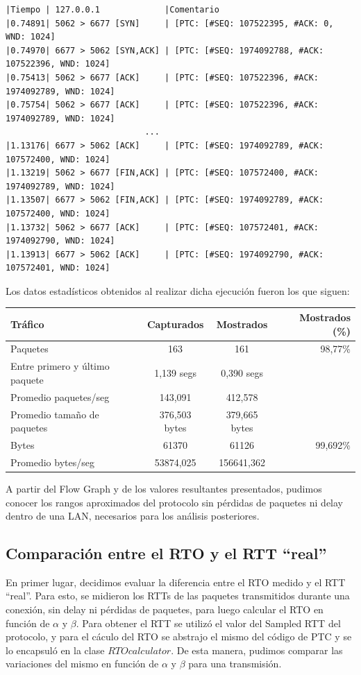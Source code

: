 \documentclass[10pt, a4paper]{article}
\begin{document}
\begin{verbatim}
|Tiempo | 127.0.0.1             |Comentario
|0.74891| 5062 > 6677 [SYN]     | [PTC: [#SEQ: 107522395, #ACK: 0, WND: 1024]
|0.74970| 6677 > 5062 [SYN,ACK] | [PTC: [#SEQ: 1974092788, #ACK: 107522396, WND: 1024]
|0.75413| 5062 > 6677 [ACK]     | [PTC: [#SEQ: 107522396, #ACK: 1974092789, WND: 1024]
|0.75754| 5062 > 6677 [ACK]     | [PTC: [#SEQ: 107522396, #ACK: 1974092789, WND: 1024]	
							...
|1.13176| 6677 > 5062 [ACK]     | [PTC: [#SEQ: 1974092789, #ACK: 107572400, WND: 1024]
|1.13219| 5062 > 6677 [FIN,ACK]	| [PTC: [#SEQ: 107572400, #ACK: 1974092789, WND: 1024]
|1.13507| 6677 > 5062 [FIN,ACK]	| [PTC: [#SEQ: 1974092789, #ACK: 107572400, WND: 1024]					
|1.13732| 5062 > 6677 [ACK]     | [PTC: [#SEQ: 107572401, #ACK: 1974092790, WND: 1024]
|1.13913| 6677 > 5062 [ACK]     | [PTC: [#SEQ: 1974092790, #ACK: 107572401, WND: 1024]
\end{verbatim}

Los datos estadísticos obtenidos al realizar dicha ejecución fueron los que siguen:\\

\begin{tabular}{l | c | c  | r}
\textbf{Tráfico} & \textbf{Capturados} & \textbf{Mostrados} & \textbf{Mostrados (\%)}\\
\hline
Paquetes & 163 & 161 & 98,77\%\\
\hline
Entre primero y último paquete & 1,139 segs & 0,390 segs & \\
\hline
Promedio paquetes/seg & 143,091 & 412,578 & \\
\hline
Promedio tamaño de paquetes & 376,503 bytes & 379,665 bytes & \\
\hline
Bytes & 61370 & 61126 & 99,692\% \\
\hline
Promedio bytes/seg & 53874,025 & 156641,362 & \\
\hline
\end{tabular}


A partir del Flow Graph y de los valores resultantes presentados, pudimos conocer los rangos aproximados del protocolo sin pérdidas de paquetes ni delay dentro de una LAN, necesarios para los análisis posteriores.
\newpage
\subsection{Comparación entre el RTO y el RTT ``real''}

En primer lugar, decidimos evaluar la diferencia entre el RTO medido y el RTT ``real''. 
Para esto, se midieron los RTTs de las paquetes transmitidos durante una conexión, sin delay ni pérdidas de paquetes, para luego calcular el RTO en función de $\alpha$ y $\beta$.
Para obtener el RTT se utilizó el valor del Sampled RTT del protocolo, y para el cáculo del RTO se abstrajo el mismo del código de PTC y se lo encapsuló en la clase $RTOcalculator$. De esta manera, pudimos comparar las variaciones del mismo en función de $\alpha$ y $\beta$ para una transmisión.
\end{document}
